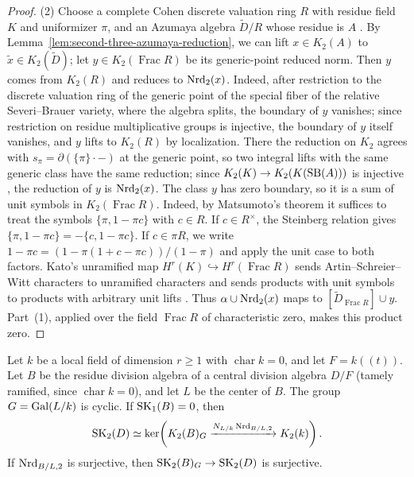\begin{proof}
(2) Choose a complete Cohen discrete valuation ring $R$ with residue field $K$ and uniformizer $\pi$, and an Azumaya algebra $\widetilde D/R$ whose residue is $A$ \cite[Expos\'e XXIV, Proposition 8.1]{SGA3}.
By Lemma~\ref{lem:second-three-azumaya-reduction}, we can lift $x\in K_2(A)$ to $\widetilde x\in K_2(\widetilde D)$; let $y\in K_2(\operatorname{Frac}R)$ be its generic-point reduced norm.
Then $y$ comes from $K_2(R)$ and reduces to $\operatorname{Nrd}_2(x)$.
Indeed, after restriction to the discrete valuation ring of the generic point of the special fiber of the relative Severi--Brauer variety, where the algebra splits, the boundary of $y$ vanishes; since restriction on residue multiplicative groups is injective, the boundary of $y$ itself vanishes, and $y$ lifts to $K_2(R)$ by localization.
There the reduction on $K_2$ agrees with $s_\pi=\partial(\{\pi\}\cdot-)$ at the generic point, so two integral lifts with the same generic class have the same reduction; since $K_2(K)\to K_2(K(\operatorname{SB}(A)))$ is injective \cite[Corollaries 5.6--5.7]{Suslin1987}, the reduction of $y$ is $\operatorname{Nrd}_2(x)$.
The class $y$ has zero boundary, so it is a sum of unit symbols in $K_2(\operatorname{Frac}R)$.
Indeed, by Matsumoto's theorem it suffices to treat the symbols $\{\pi,1-\pi c\}$ with $c\in R$.
If $c\in R^\times$, the Steinberg relation gives $\{\pi,1-\pi c\}=-\{c,1-\pi c\}$.
If $c\in\pi R$, we write $1-\pi c=(1-\pi(1+c-\pi c))/(1-\pi)$ and apply the unit case to both factors.
Kato's unramified map $H^r(K)\hookrightarrow H^r(\operatorname{Frac}R)$ sends Artin--Schreier--Witt characters to unramified characters and sends products with unit symbols to products with arbitrary unit lifts \cite[\S5.1, pp.~55--56]{Kurihara2000}.
Thus $\alpha\cup\operatorname{Nrd}_2(x)$ maps to $[\widetilde D_{\operatorname{Frac}R}]\cup y$.
Part~(1), applied over the field $\operatorname{Frac}R$ of characteristic zero, makes this product zero.
\end{proof}

\begin{proposition}\label{prop:second-residue-zero}
Let $k$ be a local field of dimension $r\ge1$ with $\operatorname{char}k=0$, and let $F=k((t))$.
Let $B$ be the residue division algebra of a central division algebra $D/F$ (tamely ramified, since $\operatorname{char}k=0$), and let $L$ be the center of $B$.
The group $G=\operatorname{Gal}(L/k)$ is cyclic.
If $\operatorname{SK}_1(B)=0$, then
\[
 \operatorname{SK}_2(D)\simeq
 \ker\!\left(K_2(B)_G
   \xrightarrow{N_{L/k}\operatorname{Nrd}_{B/L,2}}K_2(k)\right).
\]
If $\operatorname{Nrd}_{B/L,2}$ is surjective, then $\operatorname{SK}_2(B)_G\to\operatorname{SK}_2(D)$ is surjective.
\end{proposition}

